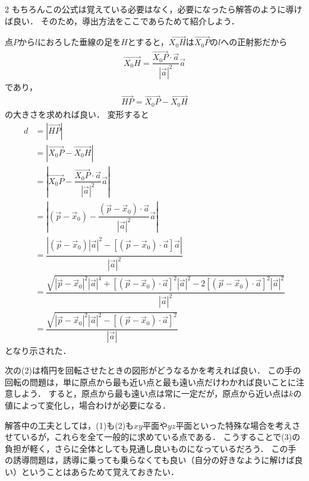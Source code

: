 \documentclass[../../main.tex]{subfiles}
\begin{document}
\begin{multicols}{2}
  もちろんこの公式は覚えている必要はなく，必要になったら解答のように導けば良い．
  そのため，導出方法をここであらためて紹介しよう．

  点$P$から$l$におろした垂線の足を$H$とすると，$\overrightarrow{X_0H}$は$\overrightarrow{X_0P}$の$l$への正射影だから
  \begin{align}
    \overrightarrow{X_0H} = \dfrac{\overrightarrow{X_0P}\cdot \vec{a}}{|\vec{a}|^2}\vec{a}
  \end{align}
  であり，
  \begin{align}
    \overrightarrow{HP} = \overrightarrow{X_0P} -\overrightarrow{X_0H}
  \end{align}
  の大きさを求めれば良い．
  変形すると
  \begin{align}
    d
    & = \left|\overrightarrow{HP}\right|                                                                                                                                                                         \\
    & = \left|\overrightarrow{X_0P}-\overrightarrow{X_0H}\right|                                                                                                                                                            \\
    & = \left|\overrightarrow{X_0P}-\dfrac{\overrightarrow{X_0P}\cdot \vec{a}}{|\vec{a}|^2}\vec{a}\right|                                                                                                                    \\
    & = \left|\left(\vec{p}-\vec{x}_0\right)-\dfrac{(\vec{p}-\vec{x}_0)\cdot \vec{a}}{|\vec{a}|^2}\vec{a}\right|                                                                                       \\
    & = \dfrac{\left|\left(\vec{p}-\vec{x}_0\right)|\vec{a}|^2-\left[(\vec{p}-\vec{x}_0)\cdot \vec{a}\right]\vec{a}\right|}{|\vec{a}|^2}                                                               \\
    & = \dfrac{\sqrt{\left|\vec{p}-\vec{x}_0\right|^2|\vec{a}|^4+\left[(\vec{p}-\vec{x}_0)\cdot \vec{a}\right]^2|\vec{a}|^2-2\left[(\vec{p}-\vec{x}_0)\cdot \vec{a}\right]^2|\vec{a}|^2}}{|\vec{a}|^2} \\
    & = \dfrac{\sqrt{\left|\vec{p}-\vec{x}_0\right|^2|\vec{a}|^2-\left[(\vec{p}-\vec{x}_0)\cdot \vec{a}\right]^2}}{|\vec{a}|}
  \end{align}
  となり示された．

  次の(2)は楕円を回転させたときの図形がどうなるかを考えれば良い．
  この手の回転の問題は，単に原点から最も近い点と最も遠い点だけわかれば良いことに注意しよう．
  すると，原点から最も遠い点は常に一定だが，原点から近い点は$k$の値によって変化し，場合わけが必要になる．

  解答中の工夫としては，(1)も(2)も$xy$平面や$yz$平面といった特殊な場合を考えさせているが，これらを全て一般的に求めている点である．
  こうすることで(3)の負担が軽く，さらに全体としても見通し良いものになっているだろう．
  この手の誘導問題は，誘導に乗っても乗らなくても良い（自分の好きなように解けば良い）ということはあらためて覚えておきたい．

  \newpage
\end{multicols}
\end{document}
